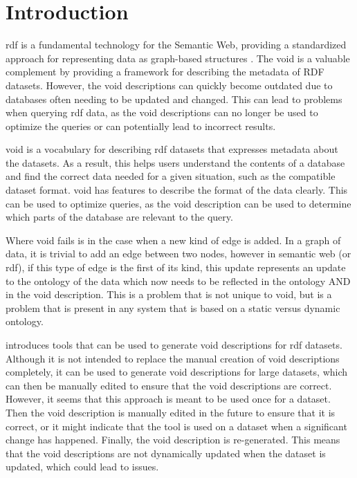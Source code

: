 \section{Introduction}\label{sec:introduction2}

\gls{rdf} is a fundamental technology for the Semantic Web, providing a standardized approach for representing data as graph-based structures \cite{the-web-of-data}. The \gls{void} is a valuable complement by providing a framework for describing the metadata of RDF datasets. However, the \gls{void} descriptions can quickly become outdated due to databases often needing to be updated and changed. This can lead to problems when querying \gls{rdf} data, as the \gls{void} descriptions can no longer be used to optimize the queries or can potentially lead to incorrect results.

\gls{void} is a vocabulary for describing \gls{rdf} datasets that expresses metadata about the datasets. As a result, this helps users understand the contents of a database and find the correct data needed for a given situation, such as the compatible dataset format. \gls{void} has features to describe the format of the data clearly. This can be used to optimize queries, as the \gls{void} description can be used to determine which parts of the database are relevant to the query. 

Where \gls{void} fails is in the case when a new kind of edge is added. In a graph of data, it is trivial to add an edge between two nodes, however in semantic web (or \gls{rdf}), if this type of edge is the first of its kind, this update represents an update to the ontology of the data which now needs to be reflected in the ontology AND in the \gls{void} description. This is a problem that is not unique to \gls{void}, but is a problem that is present in any system that is based on a static versus dynamic ontology.

\cite{creating-void-descriptions} introduces tools that can be used to generate \gls{void} descriptions for \gls{rdf} datasets. Although it is not intended to replace the manual creation of \gls{void} descriptions completely, it can be used to generate \gls{void} descriptions for large datasets, which can then be manually edited to ensure that the \gls{void} descriptions are correct. However, it seems that this approach is meant to be used once for a dataset. Then the \gls{void} description is manually edited in the future to ensure that it is correct, or it might indicate that the tool is used on a dataset when a significant change has happened. Finally, the \gls{void} description is re-generated. This means that the \gls{void} descriptions are not dynamically updated when the dataset is updated, which could lead to issues.

